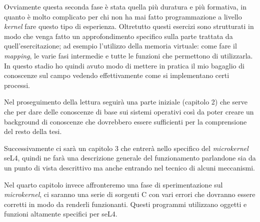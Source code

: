 Ovviamente questa seconda fase è stata quella più duratura e più formativa, in quanto è molto complicato per chi non ha mai fatto programmazione a livello \textit{kernel} fare questo tipo di esperienza. Oltretutto questi esercizi sono strutturati in modo che venga fatto un approfondimento specifico sulla parte trattata da quell'esercitazione; ad esempio l'utilizzo della memoria virtuale: come fare il \textit{mapping}, le varie fasi intermedie e tutte le funzioni che permettono di utilizzarla. In questo stadio ho quindi avuto modo di mettere in pratica il mio bagaglio di conoscenze sul campo vedendo effettivamente come si implementano certi processi.
\newline

Nel proseguimento della lettura seguirà una parte iniziale (capitolo 2) che serve che per dare delle conoscenze di base sui sistemi operativi così da poter creare un background di conoscenze che dovrebbero essere sufficienti per la comprensione del resto della tesi. 

Successivamente ci sarà un capitolo 3 che entrerà nello specifico del \textit{microkernel} seL4, quindi ne farà una descrizione generale del funzionamento parlandone sia da un punto di vista descrittivo ma anche entrando nel tecnico di alcuni meccanismi.

Nel quarto capitolo invece affronteremo una fase di sperimentazione sul \textit{microkernel}, ci saranno una serie di sorgenti C con vari errori che dovranno essere corretti in modo da renderli funzionanti. Questi programmi utilizzano oggetti e funzioni altamente specifici per seL4.